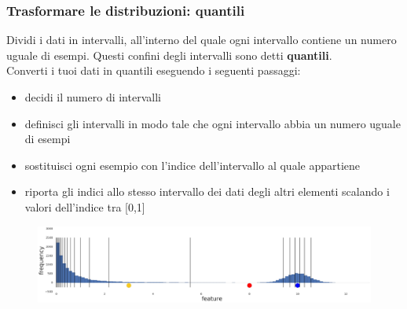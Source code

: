 \begin{frame}
	
	\frametitle{{\color{GradientDescentDiagramOrange}Trasformare le distribuzioni}: {\color{GradientDescentDiagramGreen}quantili}}
		
		Dividi i dati in intervalli, all'interno del quale ogni intervallo contiene un numero uguale di esempi.
		Questi confini degli intervalli sono detti \textbf{quantili}.\\
		Converti i tuoi dati in quantili eseguendo i seguenti passaggi:
		
		\begin{itemize}
			\item decidi il numero di intervalli
			\item definisci gli intervalli in modo tale che ogni intervallo abbia un numero uguale di esempi
			\item sostituisci ogni esempio con l'indice dell'intervallo al quale appartiene
			\item riporta gli indici allo stesso intervallo dei dati degli altri elementi scalando i valori dell'indice tra [0,1]
		\end{itemize}
		
		\begin{figure}[!htbp]
			\centering
			\includegraphics[width=12.0cm]{images/data_prep/scaling_distributions/Quantize.png}
		\end{figure}
	
\end{frame}



